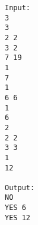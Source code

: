 \begin{verbatim}
Input:
3
3
2 2
3 2
7 19
1
7
1
6 6
1
6
2
2 2
3 3
1
12

Output:
NO
YES 6
YES 12
\end{verbatim}